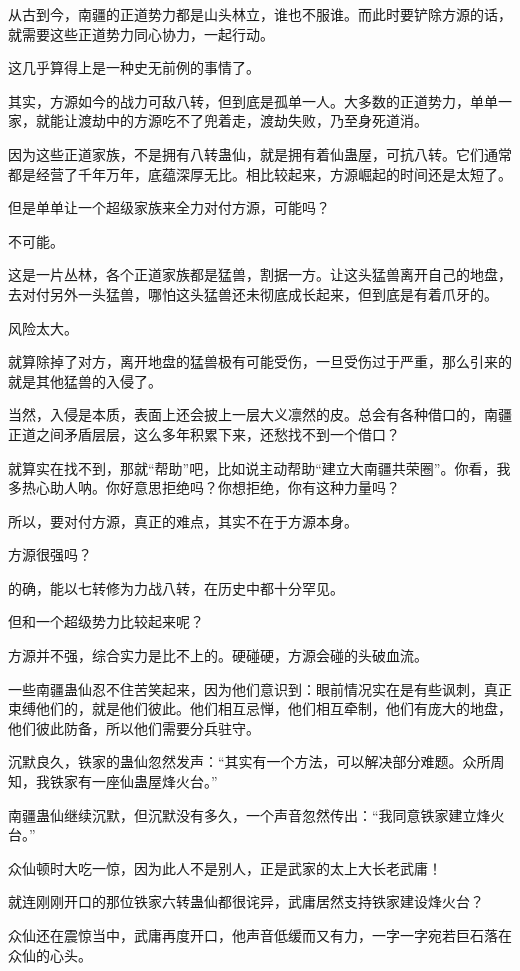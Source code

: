 \begin{this_body}
从古到今，南疆的正道势力都是山头林立，谁也不服谁。而此时要铲除方源的话，就需要这些正道势力同心协力，一起行动。

这几乎算得上是一种史无前例的事情了。

其实，方源如今的战力可敌八转，但到底是孤单一人。大多数的正道势力，单单一家，就能让渡劫中的方源吃不了兜着走，渡劫失败，乃至身死道消。

因为这些正道家族，不是拥有八转蛊仙，就是拥有着仙蛊屋，可抗八转。它们通常都是经营了千年万年，底蕴深厚无比。相比较起来，方源崛起的时间还是太短了。

但是单单让一个超级家族来全力对付方源，可能吗？

不可能。

这是一片丛林，各个正道家族都是猛兽，割据一方。让这头猛兽离开自己的地盘，去对付另外一头猛兽，哪怕这头猛兽还未彻底成长起来，但到底是有着爪牙的。

风险太大。

就算除掉了对方，离开地盘的猛兽极有可能受伤，一旦受伤过于严重，那么引来的就是其他猛兽的入侵了。

当然，入侵是本质，表面上还会披上一层大义凛然的皮。总会有各种借口的，南疆正道之间矛盾层层，这么多年积累下来，还愁找不到一个借口？

就算实在找不到，那就“帮助”吧，比如说主动帮助“建立大南疆共荣圈”。你看，我多热心助人呐。你好意思拒绝吗？你想拒绝，你有这种力量吗？

所以，要对付方源，真正的难点，其实不在于方源本身。

方源很强吗？

的确，能以七转修为力战八转，在历史中都十分罕见。

但和一个超级势力比较起来呢？

方源并不强，综合实力是比不上的。硬碰硬，方源会碰的头破血流。

一些南疆蛊仙忍不住苦笑起来，因为他们意识到：眼前情况实在是有些讽刺，真正束缚他们的，就是他们彼此。他们相互忌惮，他们相互牵制，他们有庞大的地盘，他们彼此防备，所以他们需要分兵驻守。

沉默良久，铁家的蛊仙忽然发声：“其实有一个方法，可以解决部分难题。众所周知，我铁家有一座仙蛊屋烽火台。”

南疆蛊仙继续沉默，但沉默没有多久，一个声音忽然传出：“我同意铁家建立烽火台。”

众仙顿时大吃一惊，因为此人不是别人，正是武家的太上大长老武庸！

就连刚刚开口的那位铁家六转蛊仙都很诧异，武庸居然支持铁家建设烽火台？

众仙还在震惊当中，武庸再度开口，他声音低缓而又有力，一字一字宛若巨石落在众仙的心头。


\end{this_body}
